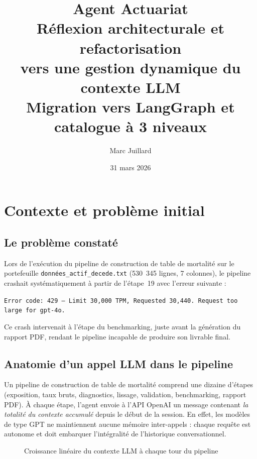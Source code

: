 \documentclass[12pt, a4paper]{article}
\title{
  \Large\textbf{Agent Actuariat}\\[0.5em]
  \large Réflexion architecturale et refactorisation\\
  vers une gestion dynamique du contexte LLM\\[0.5em]
  \normalsize Migration vers LangGraph et catalogue à 3 niveaux
}
\author{Marc Juillard}
\date{31 mars 2026}
\begin{document}
\maketitle
\tableofcontents
\newpage

\section{Contexte et problème initial}

\subsection{Le problème constaté}

Lors de l'exécution du pipeline de construction de table de mortalité sur le
portefeuille \texttt{données\_actif\_decede.txt} (530~345 lignes, 7 colonnes),
le pipeline crashait systématiquement à partir de l'étape~19 avec l'erreur
suivante :

\begin{warningbox}
\texttt{Error code: 429 --- Limit 30,000 TPM, Requested 30,440. Request too
large for gpt-4o.}
\end{warningbox}

Ce crash intervenait à l'étape du benchmarking, juste avant la génération du
rapport PDF, rendant le pipeline incapable de produire son livrable final.

\subsection{Anatomie d'un appel LLM dans le pipeline}

Un pipeline de construction de table de mortalité comprend une dizaine d'étapes
(exposition, taux bruts, diagnostics, lissage, validation, benchmarking,
rapport PDF). À chaque étape, l'agent envoie à l'API OpenAI un message
contenant \emph{la totalité du contexte accumulé} depuis le début de la
session. En effet, les modèles de type GPT ne maintiennent aucune mémoire
inter-appels : chaque requête est autonome et doit embarquer l'intégralité
de l'historique conversationnel.

\begin{figure}[h]
\centering
{}
\caption{Croissance linéaire du contexte LLM à chaque tour du pipeline}
\end{figure}
\end{document}
